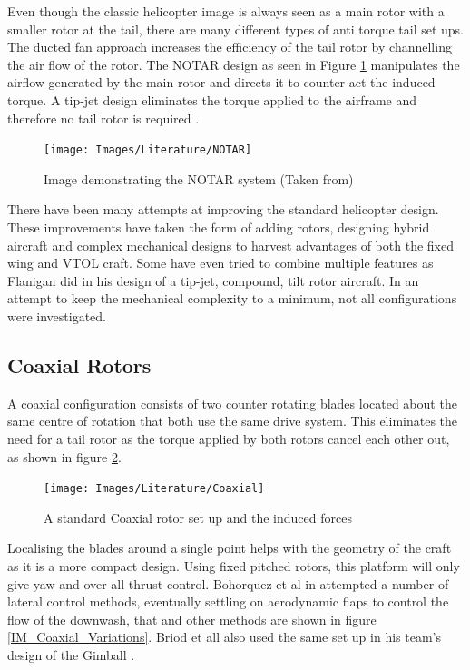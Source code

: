 Even though the classic helicopter image is always seen as a main rotor with a smaller rotor at the tail, there are many different types of anti torque tail set ups. The ducted fan approach increases the efficiency of the tail rotor by channelling the air flow of the rotor. The NOTAR design \cite{US4200252} as seen in Figure \ref{IM_NOTAR} manipulates the airflow generated by the main rotor and directs it to counter act the induced torque. A tip-jet design eliminates the torque applied to the airframe and therefore no tail rotor is required \cite{RotorConfig}. 

\begin{figure}[H]
	\centering
	\texttt{[image: Images/Literature/NOTAR]}     
	\caption{Image demonstrating the NOTAR system (Taken from\cite{Heli})}
	\label{IM_NOTAR}
\end{figure}

There have been many attempts at improving the standard helicopter design. These improvements have taken the form of adding rotors, designing hybrid aircraft and complex mechanical designs to harvest advantages of both the fixed wing and VTOL craft. Some have even tried to combine multiple features as Flanigan \cite{US7147182} did in his design of a tip-jet, compound, tilt rotor aircraft. 
In an attempt to keep the mechanical complexity to a minimum, not all configurations were investigated.

\subsection{Coaxial Rotors}
A coaxial configuration consists of two counter rotating blades located about the same centre of rotation that both use the same drive system. This eliminates the need for a tail rotor as the torque applied by both rotors cancel each other out, as shown in figure \ref{IM_Coaxial}.  

\begin{figure}[H]
	\centering
	\texttt{[image: Images/Literature/Coaxial]}     
	\caption{A standard Coaxial rotor set up and the induced forces}
	\label{IM_Coaxial}
\end{figure}

Localising the blades around a single point helps with the geometry of the craft as it is a more compact design. Using fixed pitched rotors, this platform will only give yaw and over all thrust control. Bohorquez et al in \cite{Bohorquez} attempted a number of lateral control methods, eventually settling on aerodynamic flaps to control the flow of the downwash, that and other methods are shown in figure \ref{IM_Coaxial_Variations}. Briod et all also used the same set up in his team's design of the Gimball \cite{Briod2012}.

